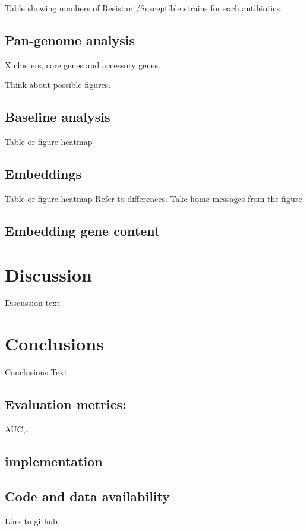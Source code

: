 \documentclass{bmcart}
\begin{document}
Table showing numbers of Resistant/Susceptible strains for each antibiotics. 

\subsection{Pan-genome analysis}
X clusters,
core genes and accessory genes. 

Think about possible figures. 

\subsection{Baseline analysis}

Table or figure heatmap

\subsection{Embeddings}

Table or figure heatmap
Refer to differences.
Take-home messages from the figure



\subsection{Embedding gene content}

\section{Discussion}
Discussion text

\section{Conclusions}
Conclusions Text



\subsection*{Evaluation metrics:}
AUC,... 

\subsection*{implementation}

\subsection*{Code and data availability}
Link to github
\end{document}
